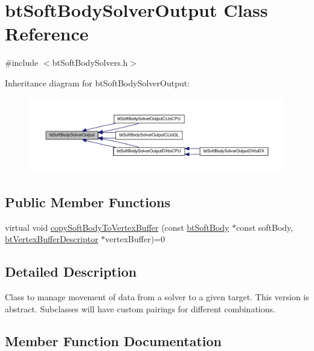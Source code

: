 \hypertarget{classbtSoftBodySolverOutput}{}\section{bt\+Soft\+Body\+Solver\+Output Class Reference}
\label{classbtSoftBodySolverOutput}


{\ttfamily \#include $<$bt\+Soft\+Body\+Solvers.\+h$>$}



Inheritance diagram for bt\+Soft\+Body\+Solver\+Output\+:
\nopagebreak
\begin{figure}[H]
\begin{center}
\leavevmode
\includegraphics[width=350pt]{classbtSoftBodySolverOutput__inherit__graph}
\end{center}
\end{figure}
\subsection*{Public Member Functions}
\begin{DoxyCompactItemize}
\item 
virtual void \hyperlink{classbtSoftBodySolverOutput_a7c3761747267f87da347aad276218663}{copy\+Soft\+Body\+To\+Vertex\+Buffer} (const \hyperlink{classbtSoftBody}{bt\+Soft\+Body} $\ast$const soft\+Body, \hyperlink{classbtVertexBufferDescriptor}{bt\+Vertex\+Buffer\+Descriptor} $\ast$vertex\+Buffer)=0
\end{DoxyCompactItemize}


\subsection{Detailed Description}
Class to manage movement of data from a solver to a given target. This version is abstract. Subclasses will have custom pairings for different combinations. 

\subsection{Member Function Documentation}
\mbox{\label{classbtSoftBodySolverOutput_a7c3761747267f87da347aad276218663}} 
